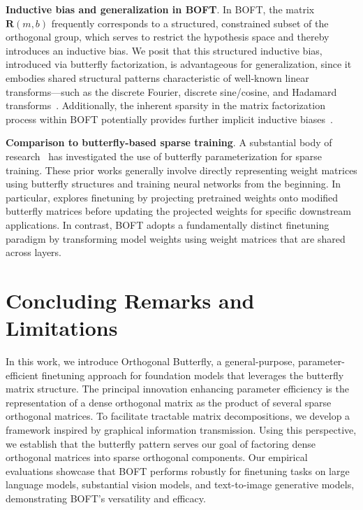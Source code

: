 \textbf{Inductive bias and generalization in BOFT}. In BOFT, the matrix $\bm{R}(m,b)$ frequently corresponds to a structured, constrained subset of the orthogonal group, which serves to restrict the hypothesis space and thereby introduces an inductive bias. We posit that this structured inductive bias, introduced via butterfly factorization, is advantageous for generalization, since it embodies shared structural patterns characteristic of well-known linear transforms—such as the discrete Fourier, discrete sine/cosine, and Hadamard transforms~\cite{dao2019kaleidoscope}. Additionally, the inherent sparsity in the matrix factorization process within BOFT potentially provides further implicit inductive biases~\cite{gunasekar2017implicit,li2018algorithmic,liu2019neural}.

\textbf{Comparison to butterfly-based sparse training}. A substantial body of research~\cite{dao2019learning,dao2019kaleidoscope,chen2022pixelated,dao2022monarch} has investigated the use of butterfly parameterization for sparse training. These prior works generally involve directly representing weight matrices using butterfly structures and training neural networks from the beginning. In particular, \cite{dao2022monarch} explores finetuning by projecting pretrained weights onto modified butterfly matrices before updating the projected weights for specific downstream applications. In contrast, BOFT adopts a fundamentally distinct finetuning paradigm by transforming model weights using weight matrices that are shared across layers.



\section{Concluding Remarks and Limitations}

In this work, we introduce Orthogonal Butterfly, a general-purpose, parameter-efficient finetuning approach for foundation models that leverages the butterfly matrix structure. The principal innovation enhancing parameter efficiency is the representation of a dense orthogonal matrix as the product of several sparse orthogonal matrices. To facilitate tractable matrix decompositions, we develop a framework inspired by graphical information transmission. Using this perspective, we establish that the butterfly pattern serves our goal of factoring dense orthogonal matrices into sparse orthogonal components. Our empirical evaluations showcase that BOFT performs robustly for finetuning tasks on large language models, substantial vision models, and text-to-image generative models, demonstrating BOFT’s versatility and efficacy.

